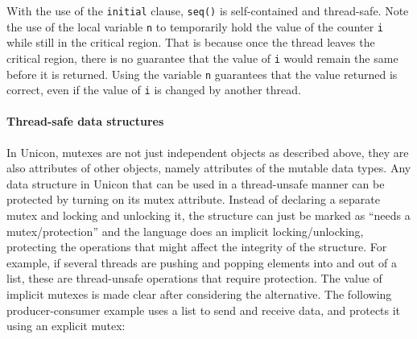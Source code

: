 With the use of the \texttt{initial} clause, \texttt{seq()} is self-contained
and thread-safe. Note the use of the local variable \texttt{n} to temporarily
hold the value of the counter \texttt{i} while still in the critical
region. That is because once the thread leaves the critical region, there is no
guarantee that the value of \texttt{i} would remain the same before it is
returned.  Using the variable \texttt{n} guarantees that the value returned is
correct, even if the value of \texttt{i} is changed by another thread.

\paragraph{Thread-safe data structures}

In Unicon, mutexes are not just independent objects as described above, they are
also attributes of other objects, namely attributes of the mutable data
types. Any data structure in Unicon that can be used in a thread-unsafe manner
can be protected by turning on its mutex attribute. Instead of declaring a
separate mutex and locking and unlocking it, the structure can just be marked as
``needs a mutex/protection'' and the language does an implicit
locking/unlocking, protecting the operations that might affect the integrity of
the structure.  For example, if several threads are pushing and popping elements
into and out of a list, these are thread-unsafe operations that require
protection.  The value of implicit mutexes is made clear after considering the
alternative. The following producer-consumer example uses a list to send and
receive data, and protects it using an explicit mutex:


